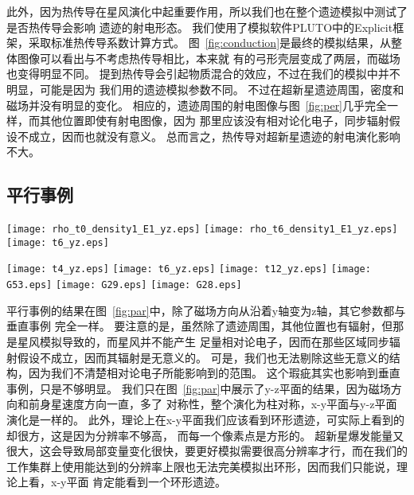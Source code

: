 此外，因为热传导在星风演化中起重要作用，所以我们也在整个遗迹模拟中测试了是否热传导会影响
遗迹的射电形态。
我们使用了模拟软件PLUTO中的Explicit框架，采取标准热传导系数计算方式。
图~\ref{fig:conduction}是最终的模拟结果，从整体图像可以看出与不考虑热传导相比，本来就
有的弓形壳层变成了两层，而磁场也变得明显不同。
\citet{Meyer2015}提到热传导会引起物质混合的效应，不过在我们的模拟中并不明显，可能是因为
我们用的遗迹模拟参数不同。
不过在超新星遗迹周围，密度和磁场并没有明显的变化。
相应的，遗迹周围的射电图像与图~\ref{fig:per}几乎完全一样，而其他位置即使有射电图像，因为
那里应该没有相对论化电子，同步辐射假设不成立，因而也就没有意义。
总而言之，热传导对超新星遗迹的射电演化影响不大。

\subsection{平行事例}

\begin{figure*}
    \centering
    \texttt{[image: rho\_t0\_density1\_E1\_yz.eps]}
    \texttt{[image: rho\_t6\_density1\_E1\_yz.eps]}
    \texttt{[image: t6\_yz.eps]}
    \caption{平行事例的模拟结果。 左图是y-z平面的星风模拟结果加上遗迹爆发区域，也就是
    遗迹模拟的初始条件。中图是y-z平面的遗迹模拟结果。右图是从中图转化来的射电流量密度图。}
\label{fig:par}
\end{figure*}

\begin{figure*}
    \centering
    \texttt{[image: t4\_yz.eps]}
    \texttt{[image: t6\_yz.eps]}
    \texttt{[image: t12\_yz.eps]}\newline
    \texttt{[image: G53.eps]}
    \texttt{[image: G29.eps]}
    \texttt{[image: G28.eps]}
    \caption{上面三幅图是不同年龄的相对射电流量密度图。下面三幅图是实际观测到的与上图
    类似的实际观测到的八字形遗迹：G53.6-2.2、G29.7-0.3、G28.6-0.1\citep{West2016}。}
\label{fig:parc}
\end{figure*}

平行事例的结果在图~\ref{fig:par}中，除了磁场方向从沿着y轴变为z轴，其它参数都与垂直事例
完全一样。
要注意的是，虽然除了遗迹周围，其他位置也有辐射，但那是星风模拟导致的，而星风并不能产生
足量相对论电子，因而在那些区域同步辐射假设不成立，因而其辐射是无意义的。
可是，我们也无法剔除这些无意义的结构，因为我们不清楚相对论电子所能影响到的范围。
这个瑕疵其实也影响到垂直事例，只是不够明显。
我们只在图~\ref{fig:par}中展示了y-z平面的结果，因为磁场方向和前身星速度方向一直，多了
对称性，整个演化为柱对称，x-y平面与y-z平面演化是一样的。
此外，理论上在x-y平面我们应该看到环形遗迹，可实际上看到的却很方，这是因为分辨率不够高，
而每一个像素点是方形的。
超新星爆发能量又很大，这会导致局部变量变化很快，要更好模拟需要很高分辨率才行，而在我们的
工作集群上使用能达到的分辨率上限也无法完美模拟出环形，因而我们只能说，理论上看，x-y平面
肯定能看到一个环形遗迹。

